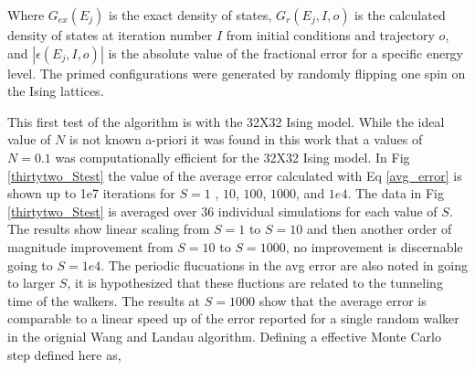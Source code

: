 \documentclass[aps,prl,reprint,superscriptaddress,showkeys]{revtex4-1}
\begin{document}
Where $G_{ex}(E_j)$ is the exact density of states, $G_{r}(E_j,I,o)$ is the calculated density of states  at iteration number $I$ from initial conditions and trajectory $o$, and $|\epsilon(E_j,I,o)|$ is the absolute value of the fractional error for a specific energy level.  The primed configurations were generated by randomly flipping one spin on the Ising lattices. 

This first test of the algorithm is with the 32X32 Ising model. While the ideal value of $N$ is not known a-priori it was found in this work that a values of $N=0.1$ was computationally efficient for the 32X32 Ising model. In Fig \ref{thirtytwo_Stest} the value of the average error calculated with Eq \ref{avg_error} is shown up to 1e7 iterations for $S=1$ , $10$, $100$, $1000$, and $1e4$. The data in Fig \ref{thirtytwo_Stest} is averaged over 36 individual simulations for each value of $S$. The results show linear scaling from $S=1$ to $S=10$ and then another order of magnitude improvement from $S=10$ to $S=1000$, no improvement is discernable going to $S=1e4$.  The periodic flucuations in the avg error are also noted in going to larger $S$, it is hypothesized that these fluctions are related to the tunneling time of the walkers. The results at $S=1000$ show that the average error is comparable to a linear speed up of the error reported for a single random walker in the orignial Wang and Landau algorithm. Defining a effective Monte Carlo step defined here as,
\end{document}
